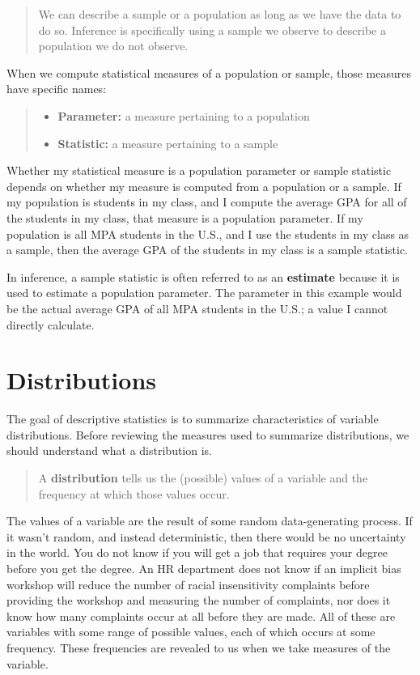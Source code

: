 \documentclass[
]{book}
\providecommand{\tightlist}{%
  \setlength{\itemsep}{0pt}\setlength{\parskip}{0pt}}
\begin{document}
\begin{quote}
We can describe a sample or a population as long as we have the data to do so. Inference is specifically using a sample we observe to describe a population we do not observe.
\end{quote}

When we compute statistical measures of a population or sample, those measures have specific names:

\begin{quote}
\begin{itemize}
\tightlist
\item
  \textbf{Parameter:} a measure pertaining to a population
\item
  \textbf{Statistic:} a measure pertaining to a sample
\end{itemize}
\end{quote}

Whether my statistical measure is a population parameter or sample statistic depends on whether my measure is computed from a population or a sample. If my population is students in my class, and I compute the average GPA for all of the students in my class, that measure is a population parameter. If my population is all MPA students in the U.S., and I use the students in my class as a sample, then the average GPA of the students in my class is a sample statistic.

In inference, a sample statistic is often referred to as an \textbf{estimate} because it is used to estimate a population parameter. The parameter in this example would be the actual average GPA of all MPA students in the U.S.; a value I cannot directly calculate.

\hypertarget{distributions}{%
\section{Distributions}\label{distributions}}

The goal of descriptive statistics is to summarize characteristics of variable distributions. Before reviewing the measures used to summarize distributions, we should understand what a distribution is.

\begin{quote}
A \textbf{distribution} tells us the (possible) values of a variable and the frequency at which those values occur.
\end{quote}

The values of a variable are the result of some random data-generating process. If it wasn't random, and instead deterministic, then there would be no uncertainty in the world. You do not know if you will get a job that requires your degree before you get the degree. An HR department does not know if an implicit bias workshop will reduce the number of racial insensitivity complaints before providing the workshop and measuring the number of complaints, nor does it know how many complaints occur at all before they are made. All of these are variables with some range of possible values, each of which occurs at some frequency. These frequencies are revealed to us when we take measures of the variable.
\end{document}
